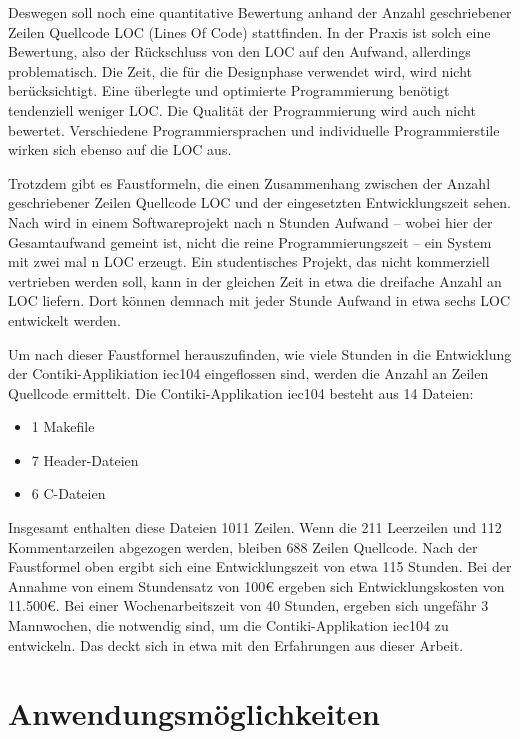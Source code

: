 Deswegen soll noch eine quantitative Bewertung anhand der Anzahl geschriebener Zeilen Quellcode LOC (Lines Of Code) stattfinden. In der Praxis ist solch eine Bewertung, also der Rückschluss von den LOC auf den Aufwand, allerdings problematisch. Die Zeit, die für die Designphase verwendet wird, wird nicht berücksichtigt. Eine überlegte und optimierte Programmierung benötigt tendenziell weniger LOC. Die Qualität der Programmierung wird auch nicht bewertet. Verschiedene Programmiersprachen und individuelle Programmierstile wirken sich ebenso auf die LOC aus. 

Trotzdem gibt es Faustformeln, die einen Zusammenhang zwischen der Anzahl geschriebener Zeilen Quellcode LOC und der eingesetzten Entwicklungszeit sehen. Nach \cite[Seite 305]{Ludewig:SoftwareEngineering} wird in einem Softwareprojekt nach n Stunden Aufwand -- wobei hier der Gesamtaufwand gemeint ist, nicht die reine Programmierungszeit -- ein System mit zwei mal n LOC erzeugt. Ein studentisches Projekt, das nicht kommerziell vertrieben werden soll, kann in der gleichen Zeit in etwa die dreifache Anzahl an LOC liefern. Dort können demnach mit jeder Stunde Aufwand in etwa sechs LOC entwickelt werden.

Um nach dieser Faustformel herauszufinden, wie viele Stunden in die Entwicklung der Contiki-Applikiation iec104 eingeflossen sind, werden die Anzahl an Zeilen Quellcode ermittelt. Die Contiki-Applikation iec104 besteht aus 14 Dateien:
\begin{itemize}
	\itemsep 0pt
	\item 1 Makefile
	\item 7 Header-Dateien
	\item 6 C-Dateien
\end{itemize}

Insgesamt enthalten diese Dateien 1011 Zeilen. Wenn die 211 Leerzeilen und 112 Kommentarzeilen abgezogen werden, bleiben 688 Zeilen Quellcode. Nach der Faustformel oben ergibt sich eine Entwicklungszeit von etwa 115 Stunden. Bei der Annahme von einem Stundensatz von 100€ ergeben sich Entwicklungskosten von 11.500€. Bei einer Wochenarbeitszeit von 40 Stunden, ergeben sich ungefähr 3 Mannwochen, die notwendig sind, um die Contiki-Applikation iec104 zu entwickeln. Das deckt sich in etwa mit den Erfahrungen aus dieser Arbeit.



\section{Anwendungsmöglichkeiten}

